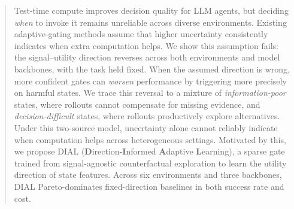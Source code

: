 \begin{abstract}
Test-time compute improves decision quality for LLM agents, but deciding \emph{when} to invoke it remains unreliable across diverse environments. Existing adaptive-gating methods assume that higher uncertainty consistently indicates when extra computation helps. We show this assumption fails: the signal--utility direction reverses across both environments and model backbones, with the task held fixed. When the assumed direction is wrong, more confident gates can \emph{worsen} performance by triggering more precisely on harmful states. We trace this reversal to a mixture of \emph{information-poor} states, where rollouts cannot compensate for missing evidence, and \emph{decision-difficult} states, where rollouts productively explore alternatives. Under this two-source model, uncertainty alone cannot reliably indicate when computation helps across heterogeneous settings. Motivated by this, we propose DIAL (\textbf{D}irection-\textbf{I}nformed \textbf{A}daptive \textbf{L}earning), a sparse gate trained from signal-agnostic counterfactual exploration to learn the utility direction of state features. Across six environments and three backbones, DIAL Pareto-dominates fixed-direction baselines in both success rate and cost.
\end{abstract}
